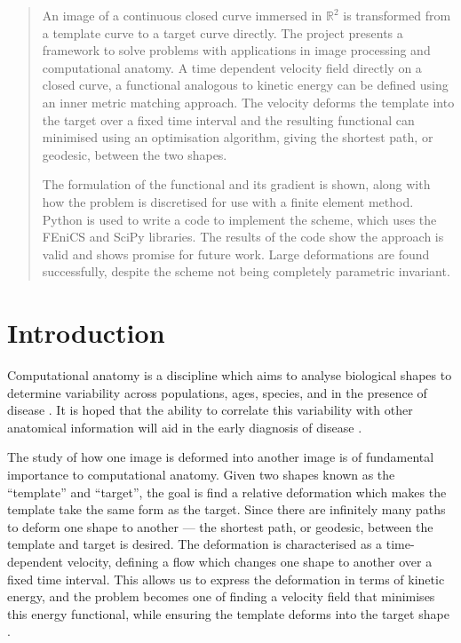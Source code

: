 \documentclass[a4paper, 12pt]{article}
\begin{document}
\maketitle
\newpage

\pagestyle{plain}
\setcounter{page}{1}

\begin{abstract}
  An image of a continuous closed curve immersed in $\mathbb{R}^2$ is
  transformed from a template curve to a target curve directly. The project
  presents a framework to solve problems with applications in image processing
  and computational anatomy. A time dependent velocity field directly on a
  closed curve, a functional analogous to kinetic energy can be defined using an
  inner metric matching approach. The velocity deforms the template into the
  target over a fixed time interval and the resulting functional can minimised
  using an optimisation algorithm, giving the shortest path, or geodesic,
  between the two shapes.

The formulation of the
  functional and its gradient is shown, along with how the problem is
  discretised for use with a finite element method. Python is used to write a code
  to implement the scheme, which uses the FEniCS and SciPy libraries. The
  results of the code show the approach is valid and shows promise for
  future work. Large deformations are found successfully, despite the scheme not
  being completely parametric invariant.

\end{abstract}
\newpage
\tableofcontents
\newpage

\pagestyle{plain}
\setcounter{page}{1}

\onehalfspacing
\section{Introduction}

Computational anatomy is a discipline which aims to analyse biological shapes to
determine variability across populations, ages, species, and in the presence of
disease \cite{miller2001group, miller2009emerging}. It is hoped that the ability
to correlate this variability with other anatomical information will aid in the
early diagnosis of disease \cite{mfca11}.

The study of how one image is deformed into another image is of fundamental
importance to computational anatomy. Given two shapes known as the ``template'' and
``target'', the goal is find a relative deformation which makes the template
take the same form as the target. Since there are infinitely many paths to
deform one shape to another --- the shortest path, or geodesic, between the
template and target is desired. The deformation is characterised as a
time-dependent velocity, defining a flow which changes one shape to another over
a fixed time interval. This allows us to express the deformation in terms of
kinetic energy, and the problem becomes one of finding a velocity field that
minimises this energy functional, while ensuring the template deforms into the
target shape \cite{beg2005computing}. 
\end{document}

